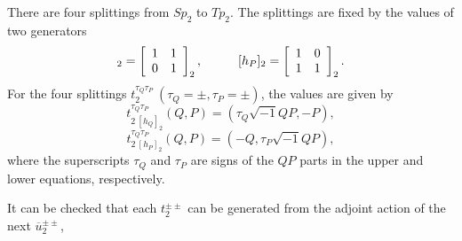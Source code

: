 \documentclass[12pt]{iopart}
\begin{document}
There are four splittings from \(Sp_2\) to \(Tp_2\).
%
The splittings are fixed by the values of two generators
\begin{equation}
[h_Q]_2=\left[\begin{array}{cc}
 1 &  1  \\
 0 &  1 \\
\end{array}\right]_2,
\hspace{10mm}
[h_P]_2=\left[\begin{array}{cc}
 1 &  0  \\
 1 &  1 \\
\end{array}\right]_2.
\end{equation}
For the four splittings \(t_2^{\tau_Q\tau_P}\ (\tau_Q=\pm,\tau_P=\pm)\),
the values are given by
\begin{equation}
t^{\tau_Q\tau_P}_{2\ [h_Q]_2}(Q,P)=(\tau_Q\sqrt{-1}QP,-P),
\end{equation}
\begin{equation}
t^{\tau_Q\tau_P}_{2\ [h_P]_2}(Q,P)=(-Q,\tau_P\sqrt{-1}QP),
\end{equation}
where the superscripts \(\tau_Q\) and \(\tau_P\) are
signs of the \(QP\) parts in the upper and lower equations, respectively.

It can be checked that each \(t_2^{\pm\pm}\) can be generated from the adjoint action of
the next \(\overline u_2^{\pm\pm}\),
\end{document}
